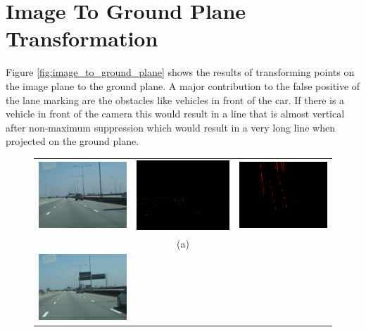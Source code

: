 \section{Image To Ground Plane Transformation}
Figure \ref{fig:image_to_ground_plane} shows the results of transforming points 
on the image plane to the ground plane. A major contribution to the false 
positive of the lane marking are the obstacles like vehicles in front of the 
car. If there is a vehicle in front of the camera this would result in a line 
that is almost vertical after non-maximum suppression which would result in a 
very long line when projected on the ground plane. 
\begin{figure}
  \begin{tabular}{c c c}
  \includegraphics[width=55mm]{figures/image_to_ground_plane_transformation/original1.jpg} &
    \includegraphics[width=55mm]{figures/image_to_ground_plane_transformation/localmaxima1.png} &
    \includegraphics[width=55mm]{figures/image_to_ground_plane_transformation/ground1.png} \\
    &(a)&\\
    \includegraphics[width=55mm]{figures/image_to_ground_plane_transformation/original2.jpg} &

\end{tabular}
\end{figure}
